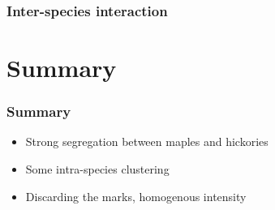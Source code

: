 \documentclass[t]{beamer}
\begin{document}
\begin{frame}
	\frametitle{Inter-species interaction}
\vskip -55pt
\begin{figure}[htb]
	  \centering
  \label{fig:intra_interactions}
\end{figure}
\end{frame}

\section{Summary}

\begin{frame}
\frametitle{Summary}

\begin{itemize}
  \item Strong segregation between maples and hickories
  \item Some intra-species clustering
  \item Discarding the marks, homogenous intensity  
\end{itemize}

\end{frame}
\end{document}
